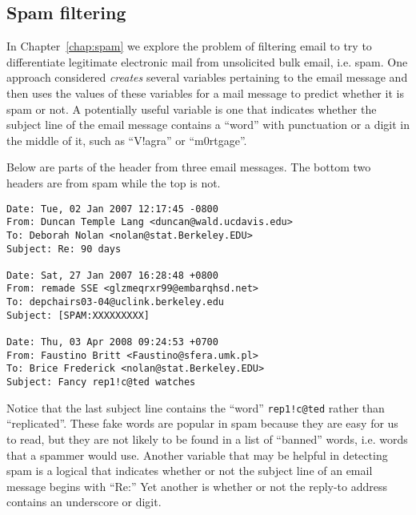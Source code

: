 \subsection{Spam filtering}\label{ssec:spam}
In Chapter~\ref{chap:spam} we explore the problem of filtering email
to try to differentiate legitimate electronic mail from unsolicited
bulk email, i.e. spam.  One approach considered \textit{creates}
several variables pertaining to the email message and then uses the
values of these variables for a mail message to predict whether it is
spam or not.  A potentially useful variable is one that indicates
whether the subject line of the email message contains a ``word'' with
punctuation or a digit in the middle of it, such as ``V!agra'' or
``m0rtgage''.  

Below are parts of the header from three email messages.  The bottom
two headers are from spam while the top is not. 
{\footnotesize{
\begin{verbatim}
Date: Tue, 02 Jan 2007 12:17:45 -0800
From: Duncan Temple Lang <duncan@wald.ucdavis.edu>
To: Deborah Nolan <nolan@stat.Berkeley.EDU>
Subject: Re: 90 days

Date: Sat, 27 Jan 2007 16:28:48 +0800
From: remade SSE <glzmeqrxr99@embarqhsd.net>
To: depchairs03-04@uclink.berkeley.edu
Subject: [SPAM:XXXXXXXXX]

Date: Thu, 03 Apr 2008 09:24:53 +0700
From: Faustino Britt <Faustino@sfera.umk.pl>
To: Brice Frederick <nolan@stat.Berkeley.EDU>
Subject: Fancy rep1!c@ted watches
\end{verbatim}
}}
Notice that the last subject line contains the ``word''
\verb+rep1!c@ted+ rather than ``replicated''.  These fake words are
popular in spam because they are easy for us to read, but they are not
likely to be found in a list of ``banned'' words, i.e. words that a
spammer would use.  Another variable that may be helpful in detecting
spam is a logical that indicates whether or not the subject line of an
email message begins with ``Re:'' Yet another is whether or not the
reply-to address contains an underscore or digit.


